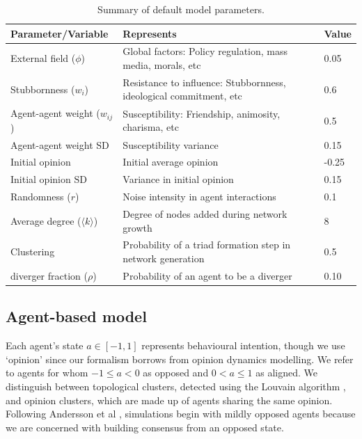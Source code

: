 \documentclass[unnumsec,webpdf,contemporary,large]{oup-authoring-template}%
\theoremstyle{thmstyleone}%
\theoremstyle{thmstyletwo}%
\theoremstyle{thmstylethree}%
\begin{document}
\begin{table}[t]
    \centering
    \caption{Summary of default model parameters.}
    \label{tab:parameters}
    \begin{tabular}{lp{5cm}l}
        \toprule
        \textbf{Parameter/Variable}          & \textbf{Represents}                                                                            & \textbf{Value} \\
        \midrule
        External field (\(\phi\))       & Global factors: Policy regulation, mass media, morals, etc                            & 0.05 \\
        Stubbornness (\(w_i\))& Resistance to influence: Stubbornness, ideological commitment, etc                    & 0.6 \\
        Agent-agent weight (\(w_{ij}\)) & Susceptibility: Friendship, animosity, charisma, etc                                  & 0.5 \\
        Agent-agent weight SD     & Susceptibility variance                                                               & 0.15 \\
        Initial opinion    & Initial average opinion                                                         & -0.25 \\
        Initial opinion SD      & Variance in initial opinion                                                     & 0.15 \\
        Randomness (\(r\))          & Noise intensity in agent interactions                                                 & 0.1 \\
        Average degree ($\langle k \rangle$)             & Degree of nodes added during network growth  & 8 \\
        Clustering                  & Probability of a triad formation step in network generation     & 0.5 \\
        diverger fraction ($\rho$)       & Probability of an agent to be a diverger & 0.10 \\
        \bottomrule
    \end{tabular}
\end{table}

\subsection{Agent-based model}\label{sec:abm}

Each agent's state \(a \in [-1,1]\)  represents behavioural intention, though we use `opinion' since our formalism borrows from opinion dynamics modelling.  We refer to agents for whom $-1\leq a<0$ as opposed and $0<a\leq1$ as aligned. We distinguish between topological clusters, detected using the Louvain algorithm \citep{blondel_fast_2008}, and opinion clusters, which are made up of agents sharing the same opinion. Following Andersson et al \cite{andersson_dynamics_2021}, simulations begin with mildly opposed agents because we are concerned with building consensus from an opposed state.
\end{document}

